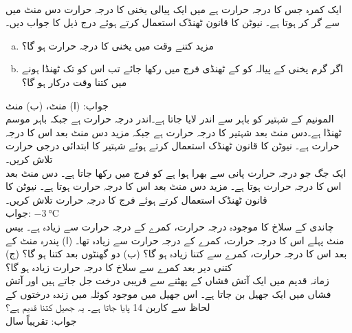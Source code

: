 \\
ایک کمرہ جس کا درجہ حرارت  ہے میں ایک پیالی یخنی کا درجہ حرارت دس منٹ میں  سے گر کر  ہوتا ہے۔ نیوٹن کا قانون ٹھنڈک استعمال کرتے ہوئے درج ذیل کا جواب دیں۔
\begin{enumerate}[a.]
\item
مزید کتنے وقت میں یخنی کا درجہ حرارت ہو گا؟
\item
اگر  گرم یخنی کے پیالہ کو  کے ٹھنڈی فرج میں رکھا جائے تب اس کو  تک ٹھنڈا ہونے میں کتنا وقت درکار ہو گا؟ 
\end{enumerate} 
جواب:\quad
(ا) منٹ، (ب)  منٹ
\\
المونیم کے  شہتیر کو باہر سے اندر لایا جاتا ہے۔اندر  درجہ حرارت  ہے جبکہ  باہر موسم ٹھنڈا ہے۔دس منٹ بعد شہتیر کا درجہ حرارت  ہے جبکہ مزید دس منٹ بعد اس کا درجہ حرارت  ہے۔ نیوٹن کا قانون ٹھنڈک استعمال کرتے ہوئے شہتیر کا ابتدائی درجی حرارت تلاش کریں۔
\\
ایک جگ جو  درجہ حرارت پانی سے بھرا ہوا ہے کو فرج میں رکھا جاتا ہے۔ دس منٹ بعد اس کا درجہ حرارت  ہوتا ہے۔ مزید دس منٹ بعد اس کا درجہ حرارت  ہوتا ہے۔ نیوٹن کا قانون ٹھنڈک استعمال کرتے ہوئے فرج کا درجہ حرارت تلاش کریں۔\\
جواب:\quad
$\SI{-3}{\celsius}$
\\
چاندی کے سلاخ کا موجودہ درجہ حرارت، کمرے کے درجہ حرارت سے  زیادہ ہے۔ بیس منٹ پہلے اس کا درجہ حرارت، کمرے کے درجہ حرارت سے  زیادہ تھا۔ (ا) پندرہ منٹ کے بعد اس کا درجہ حرارت، کمرے سے کتنا زیادہ ہو گا؟ (ب) دو گھنٹوں بعد کتنا ہو گا؟ (ج) کتنی دیر بعد کمرے سے سلاخ کا درجہ حرارت  زیادہ ہو گا؟  
\\
زمانہ قدیم میں ایک آتش فشاں کے پھٹنے سے قریبی درخت جل جاتے ہیں اور آتش فشاں میں ایک جھیل بن جاتا ہے۔ اس جھیل میں موجود کوئلہ میں زندہ درختوں کے لحاظ سے   کاربن 14 پایا جاتا ہے۔ یہ جھیل کتنا قدیم ہے؟\\
جواب:\quad
تقریباً  سال
